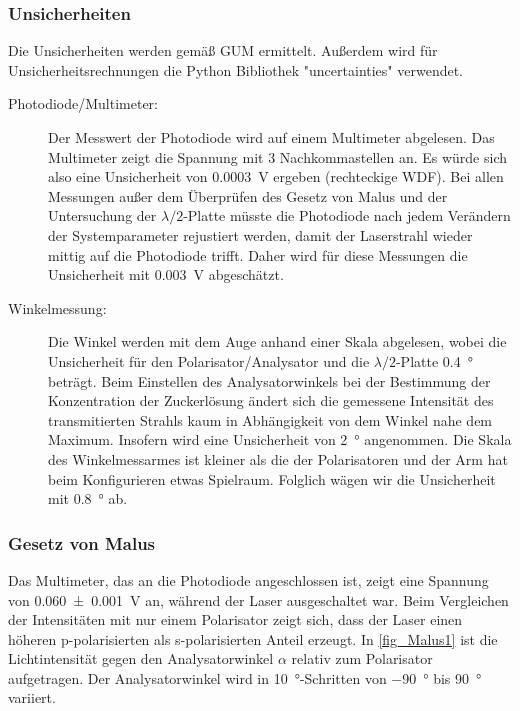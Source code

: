 \documentclass[
	a4paper,
	12pt,
	pagesize,
	ngerman
]{scrartcl}
\begin{document}
	\subsubsection{Unsicherheiten} %
	Die Unsicherheiten werden gemäß GUM ermittelt. 
	Außerdem wird für Unsicherheitsrechnungen die Python Bibliothek "uncertainties" verwendet.
	\begin{description}
		\item[Photodiode/Multimeter:] Der Messwert der Photodiode wird auf einem Multimeter abgelesen. 
			Das Multimeter zeigt die Spannung mit 3 Nachkommastellen an. 
			Es würde sich also eine Unsicherheit von \SI{0,0003}{V} ergeben (rechteckige WDF). %
			Bei allen Messungen außer dem Überprüfen des Gesetz von Malus und der Untersuchung der $\lambda/2$-Platte müsste die Photodiode nach jedem Verändern der Systemparameter rejustiert werden, damit der Laserstrahl wieder mittig auf die Photodiode trifft. 
			Daher wird für diese Messungen die Unsicherheit mit \SI{0,003}{V} abgeschätzt. %
		\item[Winkelmessung:]  Die Winkel werden mit dem Auge anhand einer Skala abgelesen, wobei die Unsicherheit für den Polarisator/Analysator und die $\lambda/2$-Platte \SI{0,4}{\degree} beträgt. 
			Beim Einstellen des Analysatorwinkels bei der Bestimmung der Konzentration der Zuckerlösung ändert sich die gemessene Intensität des transmitierten Strahls kaum in Abhängigkeit von dem Winkel nahe dem Maximum. 
			Insofern wird eine Unsicherheit von \SI{2}{\degree} angenommen.
			Die Skala des Winkelmessarmes ist kleiner als die der Polarisatoren und der Arm hat beim Konfigurieren etwas Spielraum. 
			Folglich wägen wir die Unsicherheit mit \SI{0,8}{\degree} ab.
	\end{description} 

	\subsubsection{Gesetz von Malus}
	Das Multimeter, das an die Photodiode angeschlossen ist, zeigt eine Spannung von \SI{0,060+-0,001}{V} an, während der Laser ausgeschaltet war.
	Beim Vergleichen der Intensitäten mit nur einem Polarisator zeigt sich, dass der Laser einen höheren p-polarisierten als s-polarisierten Anteil erzeugt.
	In \cref{fig_Malus1} ist die Lichtintensität gegen den Analysatorwinkel $\alpha$ relativ zum Polarisator aufgetragen.
	Der Analysatorwinkel wird in \SI{10}{\degree}-Schritten von \SI{-90}{\degree} bis \SI{90}{\degree} variiert.
\end{document}

